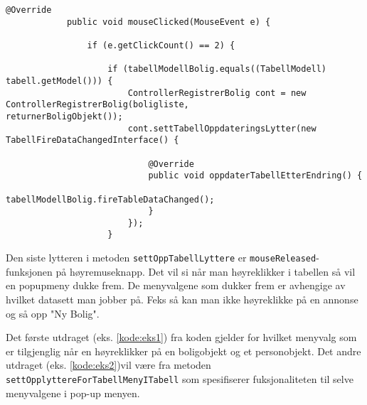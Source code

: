 \begin{lstlisting}[caption=Hendelse ved dobbelklikking på et objekt i tabellen]
			@Override
            public void mouseClicked(MouseEvent e) {

                if (e.getClickCount() == 2) {

                    if (tabellModellBolig.equals((TabellModell) tabell.getModel())) {
                        ControllerRegistrerBolig cont = new ControllerRegistrerBolig(boligliste, 				 returnerBoligObjekt());
                        cont.settTabellOppdateringsLytter(new TabellFireDataChangedInterface() {

                            @Override
                            public void oppdaterTabellEtterEndring() {
                                tabellModellBolig.fireTableDataChanged();
                            }
                        });
                    }
\end{lstlisting}


Den siste lytteren i metoden \texttt{settOppTabellLyttere} er \texttt{mouseReleased}-funksjonen på høyremuseknapp.
Det vil si når man høyreklikker i tabellen så vil en popupmeny dukke frem. De menyvalgene som dukker frem er avhengige av hvilket datasett man jobber på. Feks så kan man ikke høyreklikke på en annonse og så opp "Ny Bolig".

Det første utdraget (eks. \ref{kode:eks1}) fra koden gjelder for hvilket menyvalg som er tilgjenglig når en høyreklikker på en boligobjekt og et personobjekt. 
Det andre utdraget (eks. \ref{kode:eks2})vil være fra metoden \texttt{settOpplyttereForTabellMenyITabell} som spesifiserer fuksjonaliteten til selve menyvalgene i pop-up menyen.

